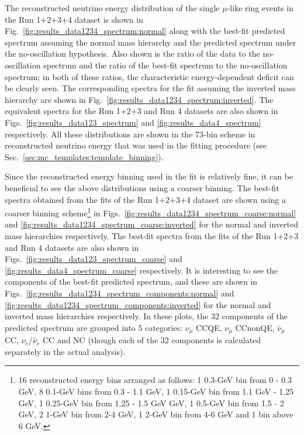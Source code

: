 The reconstructed neutrino energy distribution of the single $\mu$-like ring events in the Run 1+2+3+4 dataset 
is shown in Fig.\  \ref{fig:results_data1234_spectrum:normal} along with the best-fit predicted spectrum assuming 
the normal mass hierarchy and the predicted spectrum under the no-oscillation hypothesis. Also shown is the ratio of 
the data to the no-oscillation spectrum and the ratio of the best-fit spectrum to the no-oscillation spectrum; 
in both of these ratios, the characteristic energy-dependent deficit can be clearly seen.
The corresponding spectra for the fit assuming the inverted mass hierarchy are shown in Fig.\ \ref{fig:results_data1234_spectrum:inverted}.
The equivalent spectra for the Run 1+2+3 and Run 4 datasets are also shown in 
Figs.\ \ref{fig:results_data123_spectrum} and \ref{fig:results_data4_spectrum} respectively. 
All these distributions are shown in the 73-bin scheme in reconstructed 
neutrino energy that was used in the fitting procedure (see Sec.\ \ref{sec:mc_templates:template_binning}).

Since the reconstructed energy binning used in the fit is relatively fine, it can be beneficial to see the above distributions using 
a coarser binning. The best-fit spectra obtained from the fits of the Run 1+2+3+4 %
dataset are 
shown using a coarser binning scheme\footnote{
  16 reconstructed energy bins arranged as follows:
  1 0.3-GeV bin from 0 - 0.3 GeV,
  8 0.1-GeV bins from 0.3 - 1.1 GeV,
  1 0.15-GeV bin from 1.1 GeV - 1.25 GeV,
  1 0.25-GeV bin from 1.25 - 1.5 GeV GeV,
  1 0.5-GeV bin from 1.5 - 2 GeV,
  2 1-GeV bin from 2-4 GeV,
  1 2-GeV bin from 4-6 GeV and
  1 bin above 6 GeV.
} 
in Figs.\
\ref{fig:results_data1234_spectrum_coarse:normal} and \ref{fig:results_data1234_spectrum_coarse:inverted}
for the normal and inverted mass hierarchies respectively. The best-fit spectra from the fits of 
the Run 1+2+3 and Run 4 datasets are also shown in Figs.\
\ref{fig:results_data123_spectrum_coarse} and
\ref{fig:results_data4_spectrum_coarse} respectively. 
It is interesting to see the components of the best-fit predicted spectrum, and these are shown in
Figs.\ \ref{fig:results_data1234_spectrum_components:normal} and \ref{fig:results_data1234_spectrum_components:inverted}
for the normal and inverted mass hierarchies respectively.
In these plots, the 32 components of the predicted spectrum are grouped into 5 categories: 
$\nu_{\mu}$ CCQE, $\nu_{\mu}$ CCnonQE, $\bar{\nu}_{\mu}$ CC, $\nu_{e}$/$\bar{\nu}_{e}$ CC and NC (though each of the 32 
components is calculated separately in the actual analysis).

